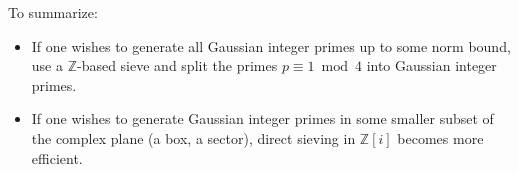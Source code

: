 \documentclass{article}
\begin{document}
To summarize:
\begin{itemize}
\item If one wishes to generate all Gaussian integer primes up to some norm bound, use a $\mathbb{Z}$-based sieve and split the primes $p\equiv 1 \bmod 4$ into Gaussian integer primes.
\item If one wishes to generate Gaussian integer primes in some smaller subset of the complex plane (a box, a sector), direct sieving in $\mathbb{Z}[i]$ becomes more efficient.
\end{itemize}
\end{document}
